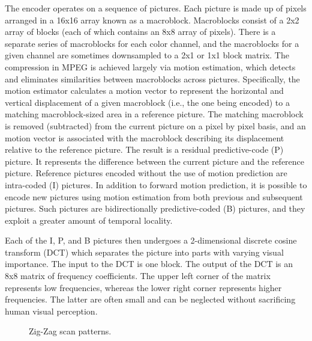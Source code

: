 The encoder operates on a sequence of pictures. Each picture is made
up of pixels arranged in a 16x16 array known as a macroblock.
Macroblocks consist of a 2x2 array of blocks (each of which contains
an 8x8 array of pixels).  There is a separate series of macroblocks
for each color channel, and the macroblocks for a given channel are
sometimes downsampled to a 2x1 or 1x1 block matrix.  The compression
in MPEG is achieved largely via motion estimation, which detects and
eliminates similarities between macroblocks across
pictures. Specifically, the motion estimator calculates a motion
vector to represent the horizontal and vertical displacement of a
given macroblock (i.e., the one being encoded) to a matching
macroblock-sized area in a reference picture.  The matching macroblock
is removed (subtracted) from the current picture on a pixel by pixel
basis, and an motion vector is associated with the macroblock
describing its displacement relative to the reference picture. The
result is a residual predictive-code (P) picture. It represents the
difference between the current picture and the reference
picture. Reference pictures encoded without the use of motion
prediction are intra-coded (I) pictures. In addition to forward motion
prediction, it is possible to encode new pictures using motion
estimation from both previous and subsequent pictures. Such pictures
are bidirectionally predictive-coded (B) pictures, and they exploit a
greater amount of temporal locality.

Each of the I, P, and B pictures then undergoes a 2-dimensional
discrete cosine transform (DCT) which separates the picture into parts
with varying visual importance. The input to the DCT is one block. 
The output of the
DCT is an 8x8 matrix of frequency coefficients. The upper left corner
of the matrix represents low frequencies, whereas the lower right
corner represents higher frequencies. The latter are often small and
can be neglected without sacrificing human visual perception.

\begin{figure}[t]
\begin{center}
\vspace{-12pt}
 \caption{Zig-Zag scan patterns.}
 \label{fig:zigzag}
\end{center}
\end{figure}

